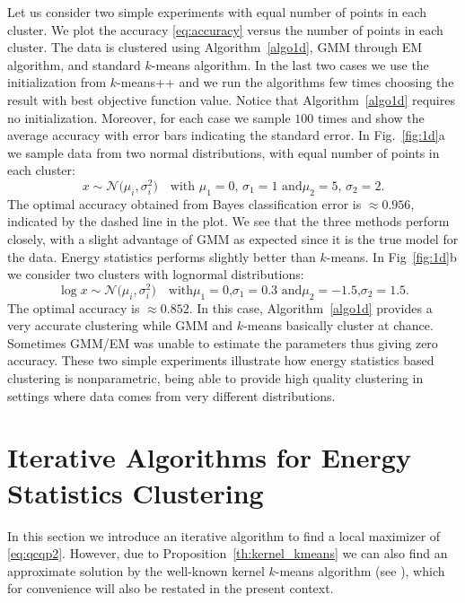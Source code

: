 \documentclass[aps,preprint,nofootinbib,floatfix]{revtex4-1}
\begin{document}
Let us consider two simple experiments with equal number of points
in each cluster. We plot the accuracy \eqref{eq:accuracy} versus the number
of points in each cluster.
The data is clustered using 
Algorithm~\ref{algo1d}, GMM through EM algorithm, and standard $k$-means 
algorithm. In the last two cases 
we use the initialization from $k$-means++ \cite{Vassilvitskii} 
and we run the algorithms
few times choosing the result with  best objective function value. 
Notice that Algorithm~\ref{algo1d} requires no initialization.
Moreover, for each case we sample $100$ times
and show the average accuracy with error bars indicating
the standard error.
In  Fig.~\ref{fig:1d}a 
we sample data from two normal distributions, with equal number of
points in each cluster:
\begin{equation}
\label{eq:two_normal}
x \sim \mathcal{N}\big(\mu_i,\sigma_i^2\big) 
\quad 
\mbox{with $\mu_1 = 0$, $\sigma_1=1$ and
$\mu_2 = 5$, $\sigma_2 = 2$.}
\end{equation}
The optimal accuracy obtained from Bayes classification error
is $ \approx 0.956$, indicated by the dashed line in the plot.
We see that the three methods
perform closely, with a slight advantage of GMM as expected since
it is the true model for the data. Energy statistics performs slightly better
than $k$-means. In Fig~\ref{fig:1d}b
we consider two clusters with lognormal distributions:
\begin{equation}
\label{eq:two_lognormal}
\log x \sim \mathcal{N}\big( \mu_i,\sigma_i^2\big) \quad
\mbox{with
$\mu_1 = 0$,
$\sigma_1 = 0.3$ and
$\mu_2 = -1.5$,
$\sigma_2 = 1.5$.}
\end{equation}
The optimal accuracy is $\approx 0.852$.
In this case,
Algorithm~\ref{algo1d} provides a very accurate clustering while
GMM and $k$-means basically cluster at chance.
Sometimes GMM/EM  was unable to estimate the parameters 
thus giving zero accuracy.
These two simple experiments illustrate
how energy statistics based clustering is nonparametric, being able
to provide high quality clustering in settings where data comes
from very different distributions.


\section{Iterative Algorithms for Energy Statistics Clustering}
\label{sec:algo}

In this section we introduce an iterative algorithm to find a local
maximizer of \eqref{eq:qcqp2}. However, due to 
Proposition~\ref{th:kernel_kmeans} we can also find an approximate
solution by the well-known kernel $k$-means algorithm 
(see \cite{Dhillon2,Dhillon}), which 
for convenience will also be restated in the present context.
\end{document}
